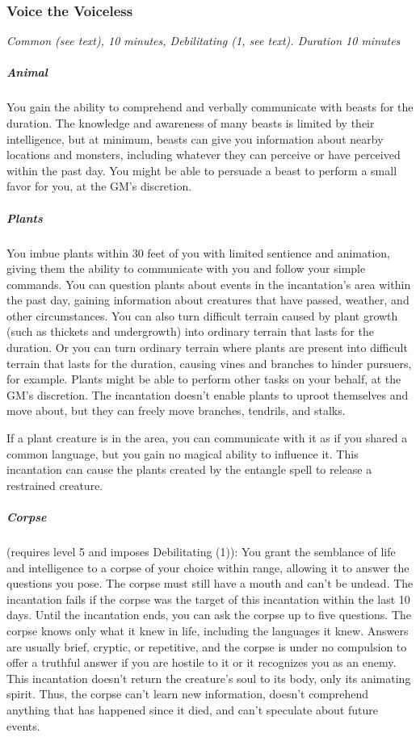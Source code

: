 \subsubsection{Voice the Voiceless}\label{inc:voice-the-voiceless}
\textit{Common (see text), 10 minutes, Debilitating (1, see text). Duration 10 minutes}

\subparagraph*{Animal} You gain the ability to comprehend and verbally communicate with beasts for the duration. The knowledge and awareness of many beasts is limited by their intelligence, but at minimum, beasts can give you information about nearby locations and monsters, including whatever they can perceive or have perceived within the past day. You might be able to persuade a beast to perform a small favor for you, at the GM's discretion. 

\subparagraph*{Plants} You imbue plants within 30 feet of you with limited sentience and animation, giving them the ability to communicate with you and follow your simple commands. You can question plants about events in the incantation's area within the past day, gaining information about creatures that have passed, weather, and other circumstances.
You can also turn difficult terrain caused by plant growth (such as thickets and undergrowth) into ordinary terrain that lasts for the duration. Or you can turn ordinary terrain where plants are present into difficult terrain that lasts for the duration, causing vines and branches to hinder pursuers, for example. Plants might be able to perform other tasks on your behalf, at the GM's discretion. The incantation doesn't enable plants to uproot themselves and move about, but they can freely move branches, tendrils, and stalks.

If a plant creature is in the area, you can communicate with it as if you shared a common language, but you gain no magical ability to influence it. This incantation can cause the plants created by the entangle spell to release a restrained creature.

\subparagraph*{Corpse} (requires level 5 and imposes Debilitating (1)): You grant the semblance of life and intelligence to a corpse of your choice within range, allowing it to answer the questions you pose. The corpse must still have a mouth and can't be undead. The incantation fails if the corpse was the target of this incantation within the last 10 days.
Until the incantation ends, you can ask the corpse up to five questions. The corpse knows only what it knew in life, including the languages it knew. Answers are usually brief, cryptic, or repetitive, and the corpse is under no compulsion to offer a truthful answer if you are hostile to it or it recognizes you as an enemy. This incantation doesn't return the creature's soul to its body, only its animating spirit. Thus, the corpse can't learn new information, doesn't comprehend anything that has happened since it died, and can't speculate about future events.

